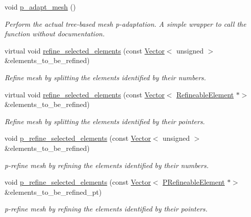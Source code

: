 \begin{DoxyCompactItemize}
void \hyperlink{classoomph_1_1TreeBasedRefineableMeshBase_ae36ab5e807acc10ccc31a7886ffc040a}{p\+\_\+adapt\+\_\+mesh} ()
\begin{DoxyCompactList}\small\item\em Perform the actual tree-\/based mesh p-\/adaptation. A simple wrapper to call the function without documentation. \end{DoxyCompactList}\item 
virtual void \hyperlink{classoomph_1_1TreeBasedRefineableMeshBase_a171be4c171cc60de5831f6a2ffaf278e}{refine\+\_\+selected\+\_\+elements} (const \hyperlink{classoomph_1_1Vector}{Vector}$<$ unsigned $>$ \&elements\+\_\+to\+\_\+be\+\_\+refined)
\begin{DoxyCompactList}\small\item\em Refine mesh by splitting the elements identified by their numbers. \end{DoxyCompactList}\item 
virtual void \hyperlink{classoomph_1_1TreeBasedRefineableMeshBase_aa6e5008f578d91d47227c1aef4ac3676}{refine\+\_\+selected\+\_\+elements} (const \hyperlink{classoomph_1_1Vector}{Vector}$<$ \hyperlink{classoomph_1_1RefineableElement}{Refineable\+Element} $\ast$$>$ \&elements\+\_\+to\+\_\+be\+\_\+refined)
\begin{DoxyCompactList}\small\item\em Refine mesh by splitting the elements identified by their pointers. \end{DoxyCompactList}\item 
void \hyperlink{classoomph_1_1TreeBasedRefineableMeshBase_a8596076849247d63cadfe579fdc17d60}{p\+\_\+refine\+\_\+selected\+\_\+elements} (const \hyperlink{classoomph_1_1Vector}{Vector}$<$ unsigned $>$ \&elements\+\_\+to\+\_\+be\+\_\+refined)
\begin{DoxyCompactList}\small\item\em p-\/refine mesh by refining the elements identified by their numbers. \end{DoxyCompactList}\item 
void \hyperlink{classoomph_1_1TreeBasedRefineableMeshBase_acfd7cb800e040fab51de2233104405c4}{p\+\_\+refine\+\_\+selected\+\_\+elements} (const \hyperlink{classoomph_1_1Vector}{Vector}$<$ \hyperlink{classoomph_1_1PRefineableElement}{P\+Refineable\+Element} $\ast$$>$ \&elements\+\_\+to\+\_\+be\+\_\+refined\+\_\+pt)
\begin{DoxyCompactList}\small\item\em p-\/refine mesh by refining the elements identified by their pointers. \end{DoxyCompactList}\item 

\end{DoxyCompactItemize}

